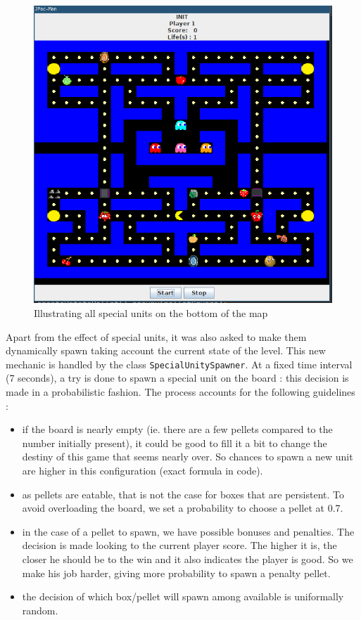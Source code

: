 \documentclass[]{article}
\begin{document}
\begin{figure}[h]
\centering
\includegraphics[width=0.62\linewidth]{S2-extension}
\caption{Illustrating all special units on the bottom of the map}
\label{fig:S1_special}
\end{figure}

\newpage

Apart from the effect of special units, it was also asked to make them dynamically spawn taking account the current state of the level. This new mechanic is handled by the class \texttt{SpecialUnitySpawner}. At a fixed time interval (7 seconds), a try is done to spawn a special unit on the board : this decision is made in a probabilistic fashion. The process accounts for the following guidelines :
\begin{itemize}
\item if the board is nearly empty (ie. there are a few pellets compared to the number initially present), it could be good to fill it a bit to change the destiny of this game that seems nearly over. So chances to spawn a new unit are higher in this configuration (exact formula in code).
\item as pellets are eatable, that is not the case for boxes that are persistent. To avoid overloading the board, we set a probability to choose a pellet at 0.7.
\item in the case of a pellet to spawn, we have possible bonuses and penalties. The decision is made looking to the current player score. The higher it is, the closer he should be to the win and it also indicates the player is good. So we make his job harder, giving more probability to spawn a penalty pellet.
\item the decision of which box/pellet will spawn among available is uniformally random.
\end{itemize}
\end{document}
